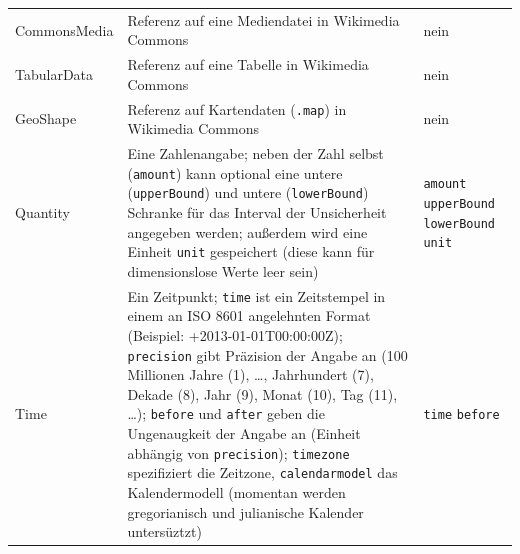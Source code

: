 \begin{table}
\begin{adjustwidth}{-1.5cm}{-0.5cm}
\begin{minipage}{\textwidth}
\begin{tabular}{l p{} p{}}
      CommonsMedia     & Referenz auf eine Mediendatei in Wikimedia Commons                                                                                                            & nein \\
      TabularData      & Referenz auf eine Tabelle in Wikimedia Commons                                                                                                                & nein \\
      GeoShape         & Referenz auf Kartendaten (\verb|.map|) in Wikimedia Commons                                                                                                   & nein \\
      Quantity         & Eine Zahlenangabe; neben der Zahl selbst (\verb|amount|) kann optional eine untere (\verb|upperBound|) und untere (\verb|lowerBound|) Schranke für das
                         Interval der Unsicherheit angegeben werden; außerdem wird eine Einheit \verb|unit| gespeichert (diese kann für dimensionslose Werte leer sein)                & \verb|amount|\newline{}
                                                                                                                                                                                         \verb|upperBound|\newline{}
                                                                                                                                                                                         \verb|lowerBound|\newline{}
                                                                                                                                                                                         \verb|unit| \\
      Time             & Ein Zeitpunkt; \verb|time| ist ein Zeitstempel in einem an ISO 8601 angelehnten Format (Beispiel: +2013-01-01T00:00:00Z);
                         \verb|precision| gibt Präzision der Angabe an (100 Millionen Jahre (1), \ldots, Jahrhundert (7), Dekade (8), Jahr (9), Monat (10), Tag (11), \ldots);
                         \verb|before| und \verb|after| geben die Ungenaugkeit der Angabe an (Einheit abhängig von \verb|precision|);
                         \verb|timezone| spezifiziert die Zeitzone, \verb|calendarmodel| das Kalendermodell (momentan werden gregorianisch und julianische Kalender untersüztzt)            & \verb|time|\newline{}
                                                                                                                                                                                         \verb|before|\newline{}

\end{tabular}
\end{minipage}
\end{adjustwidth}
\end{table}
